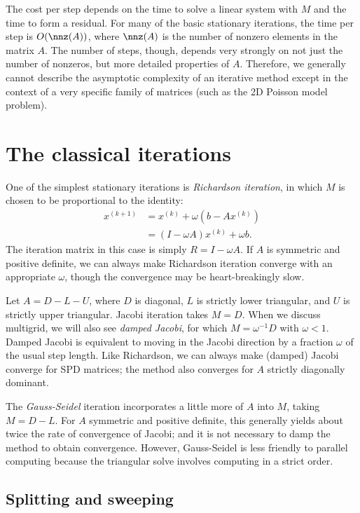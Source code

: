 \documentclass[12pt, leqno]{article} %
\begin{document}
The cost per step depends on the time to solve a linear
system with $M$ and the time to form a residual.
For many of the basic stationary iterations, the time per step is
$O(\nnz(A))$, where $\nnz(A)$ is the number of nonzero elements in
the matrix $A$.  The number of steps, though, depends very strongly
on not just the number of nonzeros, but more detailed properties of
$A$.  Therefore, we generally cannot describe the asymptotic complexity
of an iterative method except in the context of a very specific family
of matrices (such as the 2D Poisson model problem).

\section{The classical iterations}

One of the simplest stationary iterations is {\em Richardson iteration},
in which $M$ is chosen to be proportional to the identity:
\begin{align*}
  x^{(k+1)} &= x^{(k)} + \omega (b-Ax^{(k)}) \\
            &= (I-\omega A) x^{(k)} + \omega b.
\end{align*}
The iteration matrix in this case is simply $R = I - \omega A$.  If $A$
is symmetric and positive definite, we can always make Richardson
iteration converge with an appropriate $\omega$, though the convergence
may be heart-breakingly slow.

Let $A = D - L - U$, where $D$ is diagonal, $L$ is strictly lower
triangular, and $U$ is strictly upper triangular.  Jacobi iteration
takes $M = D$.  When we discuss multigrid, we will also see  {\em damped
Jacobi}, for which $M = \omega^{-1} D$ with $\omega < 1$.  Damped Jacobi
is equivalent to moving in the Jacobi direction by a fraction $\omega$
of the usual step length.  Like Richardson, we can always make (damped)
Jacobi converge for SPD matrices; the method also converges for $A$
strictly diagonally dominant.

The {\em Gauss-Seidel} iteration incorporates a little more of $A$ into
$M$, taking $M = D-L$.  For $A$ symmetric and positive definite, this
generally yields about twice the rate of convergence of Jacobi; and it
is not necessary to damp the method to obtain convergence.  However,
Gauss-Seidel is less friendly to parallel computing because the
triangular solve involves computing in a strict order.

\subsection{Splitting and sweeping}
\end{document}
